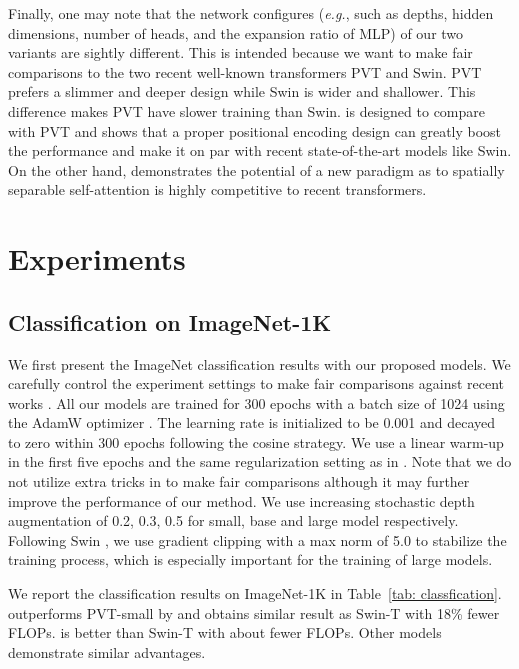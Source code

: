 \documentclass{article}
\def \eg {\textit{e.g.}\xspace}
\def \altour   {Twins-SVT}
\def \altsmall   {Twins-SVT-S}
\def \pcpvt  {Twins-PCPVT}
\def \pcpvtsmall {Twins-PCPVT-S}
\begin{document}
Finally, one may note that the network configures (\eg, such as depths, hidden dimensions, number of heads, and the expansion ratio of MLP) of our two variants are sightly different. This is intended because we want to make fair comparisons to the two recent well-known transformers PVT and Swin. PVT prefers a slimmer and deeper design while Swin is wider and shallower. This difference makes PVT have slower training than Swin. \text{\pcpvt} is designed to compare with PVT and shows that a proper positional encoding design can greatly boost the performance and make it on par with recent state-of-the-art models like Swin. On the other hand, \text{\altour} demonstrates the potential of a new paradigm as to spatially separable self-attention is highly competitive to recent transformers.




\section{Experiments}
\subsection{Classification on ImageNet-1K}
We first present the ImageNet classification results with our proposed models. We carefully control the experiment settings to make fair comparisons 
against 
recent works \cite{touvron2020training,wang2021pyramid,chu2021ConditionalPE}. All our models are trained for 300 epochs with a batch size of 1024  using the  AdamW optimizer \cite{loshchilov2018decoupled}. The learning rate is initialized to be 
0.001 and decayed to zero within 300 epochs following the cosine strategy. We use a linear warm-up in the first five epochs and the same regularization setting as in  \cite{touvron2020training}. Note that we do not utilize extra tricks in \cite{touvron2021going,jiang2021token} to make fair comparisons although it 
may 
further improve the performance of our method. We use increasing stochastic depth \cite{huang2016deep} augmentation   of 0.2, 0.3,  0.5 for small, base and large model respectively. Following Swin \cite{liu2021swin}, we use gradient clipping with a max norm of 5.0 to stabilize the training process, which  is especially  important for the training of  large models. 



We report the classification results on ImageNet-1K \cite{russakovsky2015imagenet} in Table~\ref{tab: classfication}. \text{\pcpvtsmall} outperforms PVT-small by  and obtains similar result as Swin-T with 18\% fewer FLOPs. \text{\altsmall} is better than Swin-T with about  fewer FLOPs. Other models demonstrate 
similar advantages. 
\end{document}
